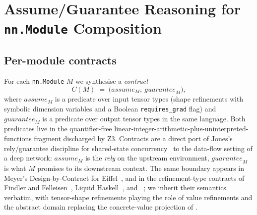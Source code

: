 
\section{Assume/Guarantee Reasoning for \texttt{nn.Module} Composition}
\label{sec:assume-guarantee}

\subsection{Per-module contracts}
\label{sec:ag:contracts}

For each \texttt{nn.Module} $M$ we synthesise a \emph{contract}
\[
   C(M) \;=\; \bigl(\mathit{assume}_M,\ \mathit{guarantee}_M\bigr),
\]
where $\mathit{assume}_M$ is a predicate over input tensor types
(shape refinements with symbolic dimension variables and a Boolean
\texttt{requires\_grad} flag) and $\mathit{guarantee}_M$ is a predicate
over output tensor types in the same language.  Both predicates live in
the quantifier-free linear-integer-arithmetic-plus-uninterpreted-functions
fragment discharged by Z3.  Contracts are a direct port of Jones's
rely/guarantee discipline for shared-state concurrency~\citep{jones1983tentative}
to the data-flow setting of a deep network: $\mathit{assume}_M$ is the
\emph{rely} on the upstream environment, $\mathit{guarantee}_M$ is what
$M$ promises to its downstream context.  The same boundary appears in
Meyer's Design-by-Contract for Eiffel~\citep{meyer1992applying}, and in
the refinement-type contracts of Findler and
Felleisen~\citep{findler2002contracts}, Liquid Haskell~\citep{vazou2014refinement},
and \fstar~\citep{swamy2016dependent}; we inherit their semantics
verbatim, with tensor-shape refinements playing the role of value
refinements and the abstract domain replacing the concrete-value
projection of \citet{cousot1977abstract}.

